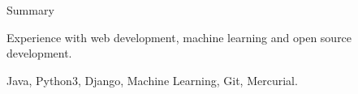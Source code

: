 \documentclass{resume} %
\begin{document}
\hypersetup{
    colorlinks=true,
    linkcolor=cyan,      
    urlcolor=cyan,
}


\usepackage[left=0.75in,top=0.52in,right=0.75in,bottom=0.52in]{geometry} %
\usepackage[colorlinks=true, linkcolor=black, urlcolor=black]{hyperref}
\usepackage{marvosym}
\usepackage{graphicx}

\address{\href{mailto:siddhijha023@gmail.com}{siddhijha023@gmail.com} \\
         \href{https://www.linkedin.com/in/siddhi-jha/}{in/siddhi\_jha}\ \\
         \href{https://github.com/siddhi523}{github.com/siddhi} \\
         +91-9971584787}



\begin{rSection}{Summary}
  \begin{rSummarySection}
  {
    \item Experience with web development, machine learning and open source development.
    \item Java, Python3, Django, Machine Learning, Git, Mercurial.
  }
  \end{rSummarySection}
\end{rSection}

\end{document}
